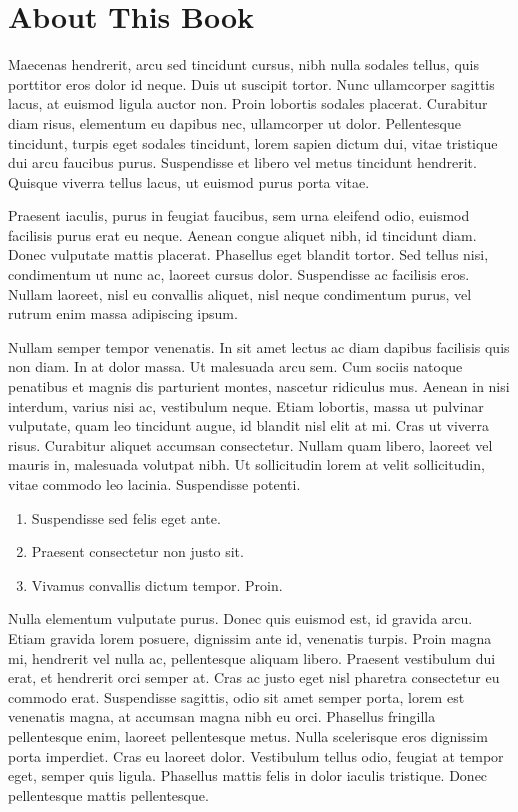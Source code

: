\chapter{About This Book}


Maecenas hendrerit, arcu sed tincidunt cursus, nibh nulla sodales tellus, quis porttitor eros dolor id neque. Duis ut suscipit tortor. Nunc ullamcorper sagittis lacus, at euismod ligula auctor non. Proin lobortis sodales placerat. Curabitur diam risus, elementum eu dapibus nec, ullamcorper ut dolor. Pellentesque tincidunt, turpis eget sodales tincidunt, lorem sapien dictum dui, vitae tristique dui arcu faucibus purus. Suspendisse et libero vel metus tincidunt hendrerit. Quisque viverra tellus lacus, ut euismod purus porta vitae.

Praesent iaculis, purus in feugiat faucibus, sem urna eleifend odio, euismod facilisis purus erat eu neque. Aenean congue aliquet nibh, id tincidunt diam. Donec vulputate mattis placerat. Phasellus eget blandit tortor. Sed tellus nisi, condimentum ut nunc ac, laoreet cursus dolor. Suspendisse ac facilisis eros. Nullam laoreet, nisl eu convallis aliquet, nisl neque condimentum purus, vel rutrum enim massa adipiscing ipsum.

Nullam semper tempor venenatis. In sit amet lectus ac diam dapibus facilisis quis non diam. In at dolor massa. Ut malesuada arcu sem. Cum sociis natoque penatibus et magnis dis parturient montes, nascetur ridiculus mus. Aenean in nisi interdum, varius nisi ac, vestibulum neque. Etiam lobortis, massa ut pulvinar vulputate, quam leo tincidunt augue, id blandit nisl elit at mi. Cras ut viverra risus. Curabitur aliquet accumsan consectetur. Nullam quam libero, laoreet vel mauris in, malesuada volutpat nibh. Ut sollicitudin lorem at velit sollicitudin, vitae commodo leo lacinia. Suspendisse potenti.

\begin{enumerate}
  \item Suspendisse sed felis eget ante.
  \item Praesent consectetur non justo sit.
  \item Vivamus convallis dictum tempor. Proin.
\end{enumerate}


Nulla elementum vulputate purus. Donec quis euismod est, id gravida arcu. Etiam gravida lorem posuere, dignissim ante id, venenatis turpis. Proin magna mi, hendrerit vel nulla ac, pellentesque aliquam libero. Praesent vestibulum dui erat, et hendrerit orci semper at. Cras ac justo eget nisl pharetra consectetur eu commodo erat. Suspendisse sagittis, odio sit amet semper porta, lorem est venenatis magna, at accumsan magna nibh eu orci. Phasellus fringilla pellentesque enim, laoreet pellentesque metus. Nulla scelerisque eros dignissim porta imperdiet. Cras eu laoreet dolor. Vestibulum tellus odio, feugiat at tempor eget, semper quis ligula. Phasellus mattis felis in dolor iaculis tristique. Donec pellentesque mattis pellentesque.
